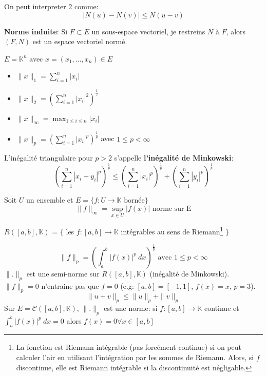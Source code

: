 \documentclass[a4paper]{report}
\theoremstyle{definition}
\begin{document}
On peut interpreter $2$ comme:
 \[
\left| N(u) - N(v) \right| \le N(u - v)
\] 

\begin{prop}
    \textbf{Norme induite}: Si $F \subset E$ un sous-espace vectoriel, je restreins $N$ à  $F$, alors  $(F, N)$ est un espace vectoriel normé.
\end{prop}

\begin{eg}
    $E = \mathbb{K}^n$ avec  $x = (x_1, \ldots, x_n) \in E$ 
    \begin{itemize}
        \item $\|x\|_1 = \sum_{i=1}^{n} |x_i|$
        \item $\|x\|_2 = \left(\sum_{i=1}^{n} |x_i|^2\right)^{\frac{1}{2}}$
        \item $\|x\|_{\infty} = \max_{1 \le i \le n} |x_i|$
        \item $\|x\|_p = \left( \sum_{i=1}^{n} |x_i|^p \right)^{\frac{1}{p}}$ avec $1 \le p < \infty$
    \end{itemize}
\end{eg}

\begin{prop}
    L'inégalité triangulaire pour $p > 2$ s'appelle \textbf{l'inégalité de Minkowski}:
    \[
        \left( \sum_{i=1}^{n} |x_i + y_i|^p \right)^{\frac{1}{p}} \le  \left( \sum_{i=1}^{n} |x_i |^p \right)^{\frac{1}{p}} + \left( \sum_{i=1}^{n} |y_i|^p \right)^{\frac{1}{p}}
    \] 
\end{prop}

\begin{definition}
    Soit $U$ un ensemble et $E = \{f: U \to \mathbb{K} \text{ bornée} \}$ 
    \[
        \|f\|_{\infty} = \sup_{x \in U} |f(x)| \text{ norme sur E}
    \] 
\end{definition}
\begin{definition}
    $R([a, b], \mathbb{K})$ = $\{$ les  $f: [a, b] \to \mathbb{K}$ intégrables au sens de Riemann\footnote{La fonction est Riemann intégrable (pas forcément continue) si on peut calculer l'air en utilisant l'intégration par les sommes de Riemann. Alors, si $f$ discontinue, elle est Riemann intégrable si la discontinuité est négligable.} $\}$
\end{definition}

\begin{eg}
    \[
        \|f\|_{p} = \left( \int_{{a}}^{{b}} {|f(x)|^{p}} \: d{x} {} \right)^{\frac{1}{p}} \text{ avec } 1 \le p < \infty
    \] 
    $\| . \|_{p}$ est une semi-norme sur $R([a, b], \mathbb{K})$ (inégalité de Minkowski). $\|f\|_{p} = 0$ n'entraine pas que $f = 0$ (e.g: $[a, b] = [-1, 1]$,  $f(x) = x$, $p = 3$). 
    \[
        \|u + v\|_{p} \le \|u\|_p + \|v\|_p
    \] 
    Sur $E = \mathcal{C}([a, b], \mathbb{K})$,  $\| . \|_{p}$ est une norme:
    si $f: [a, b] \to \mathbb{K}$ continue et $\int_{{a}}^{{b}} {|f(x)|^p} \: d{x} = 0$ alors $f(x) = 0 \forall x \in [a, b]$
\end{eg}
\end{document}
